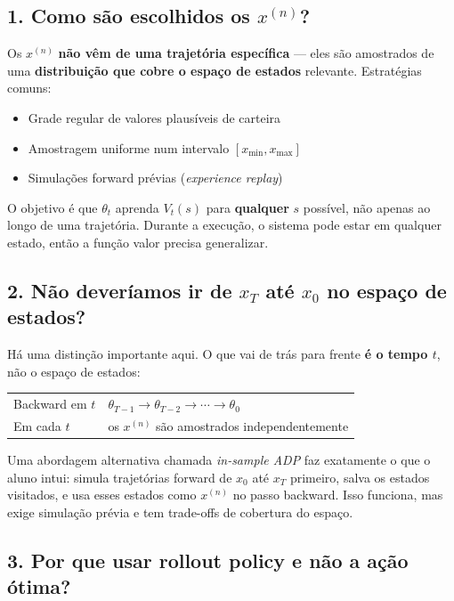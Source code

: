 \documentclass[12pt,a4paper]{article}
\begin{document}
\subsection{1. Como são escolhidos os \texorpdfstring{$x^{(n)}$}{x(n)}?}

Os $x^{(n)}$ \textbf{não vêm de uma trajetória específica} --- eles são amostrados de uma \textbf{distribuição que cobre o espaço de estados} relevante. Estratégias comuns:
\begin{itemize}
    \item Grade regular de valores plausíveis de carteira
    \item Amostragem uniforme num intervalo $[x_{\min}, x_{\max}]$
    \item Simulações forward prévias (\textit{experience replay})
\end{itemize}

O objetivo é que $\theta_t$ aprenda $V_t(s)$ para \textbf{qualquer} $s$ possível, não apenas ao longo de uma trajetória. Durante a execução, o sistema pode estar em qualquer estado, então a função valor precisa generalizar.

\subsection{2. Não deveríamos ir de \texorpdfstring{$x_T$}{xT} até \texorpdfstring{$x_0$}{x0} no espaço de estados?}

Há uma distinção importante aqui. O que vai de trás para frente \textbf{é o tempo $t$}, não o espaço de estados:

\begin{center}
\begin{tabular}{ll}
\hline
Backward em $t$ & $\theta_{T-1} \to \theta_{T-2} \to \cdots \to \theta_0$ \\
Em cada $t$ & os $x^{(n)}$ são amostrados independentemente \\
\hline
\end{tabular}
\end{center}

Uma abordagem alternativa chamada \textit{in-sample ADP} faz exatamente o que o aluno intui: simula trajetórias forward de $x_0$ até $x_T$ primeiro, salva os estados visitados, e usa esses estados como $x^{(n)}$ no passo backward. Isso funciona, mas exige simulação prévia e tem trade-offs de cobertura do espaço.

\subsection{3. Por que usar rollout policy e não a ação ótima?}
\end{document}
